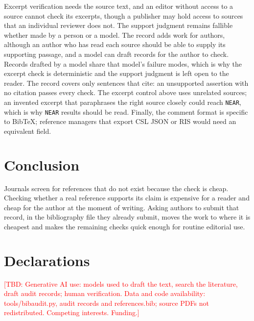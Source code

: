 \documentclass[11pt]{article}
\newcommand{\TBD}[1]{\textcolor{red}{[TBD: #1]}}
\begin{document}
Excerpt verification needs the source text, and an editor without access to a source cannot check its excerpts, though a publisher may hold access to sources that an individual reviewer does not. The support judgment remains fallible whether made by a person or a model. The record adds work for authors, although an author who has read each source should be able to supply its supporting passage, and a model can draft records for the author to check. Records drafted by a model share that model's failure modes, which is why the excerpt check is deterministic and the support judgment is left open to the reader. The record covers only sentences that cite: an unsupported assertion with no citation passes every check. The excerpt control above uses unrelated sources; an invented excerpt that paraphrases the right source closely could reach \texttt{NEAR}, which is why \texttt{NEAR} results should be read. Finally, the comment format is specific to BibTeX; reference managers that export CSL JSON or RIS would need an equivalent field.

\section{Conclusion}

Journals screen for references that do not exist because the check is cheap. Checking whether a real reference supports its claim is expensive for a reader and cheap for the author at the moment of writing. Asking authors to submit that record, in the bibliography file they already submit, moves the work to where it is cheapest and makes the remaining checks quick enough for routine editorial use.

\section*{Declarations}
\TBD{Generative AI use: models used to draft the text, search the literature, draft audit records; human verification. Data and code availability: tools/bibaudit.py, audit records and references.bib; source PDFs not redistributed. Competing interests. Funding.}



\end{document}
